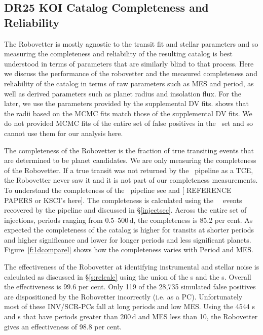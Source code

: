 \subsection{DR25 KOI Catalog Completeness and Reliability}
The Robovetter is mostly agnostic to the transit fit and stellar parameters and so measuring the completeness and reliability of the resulting catalog is best understood in terms of parameters that are similarly blind to that process.  Here we discuss the performance of the robovetter and the measured completeness and reliability of the catalog in terms of raw parameters such as MES and period, as well as derived parameters such as planet radius and insolation flux.  For the later, we use the parameters provided by the supplemental DV fits.  \citet{Christiansen2017} shows that the radii based on the MCMC fits match those of the supplemental DV fits. We do not provided MCMC fits of the entire set of false positives in the \opstce\ set and so cannot use them for our analysis here.


The completeness of the Robovetter is the fraction of true transiting events that are determined to be planet candidates.  We are only measuring the completeness of the Robovetter. If a true transit was not returned by the \Kepler\ pipeline as a TCE, the Robovetter never saw it and it is not part of our completeness measurements. To understand the completeness of the \Kepler\ pipeline see \citet{Christiansen2017} and \citet{Burke2017} [ REFERENCE PAPERS or KSCI's here].  The completeness is calculated using the \ninjtce\ \injtce\ events recovered by the pipeline and discussed in \S\ref{injectsec}.  Across the entire set of injections, periods ranging from 0.5--500\,d, the completeness is 85.2 per cent. As expected the completeness of the catalog is higher for transits at shorter periods and higher significance and lower for longer periods and less significant planets. Figure~\ref{f:1dcomparel} shows how the completeness varies with Period and MES. 

The effectiveness of the Robovetter at identifying instrumental and stellar noise is calculated as discussed in \S\ref{s:relcalc} using the union of the \invtce s and the \scrtce s. Overall the effectiveness is 99.6 per cent.  Only 119 of the 28,735 simulated false positives are dispositioned by the Robovetter incorrectly (i.e. as a PC).  Unfortunately most of these INV/SCR-PCs fall at long periods and low MES.
Using the 4544 \invtce s and \scrtce s that have periods greater than 200\,d and MES less than 10, the Robovetter gives an effectiveness of 98.8 per cent.

